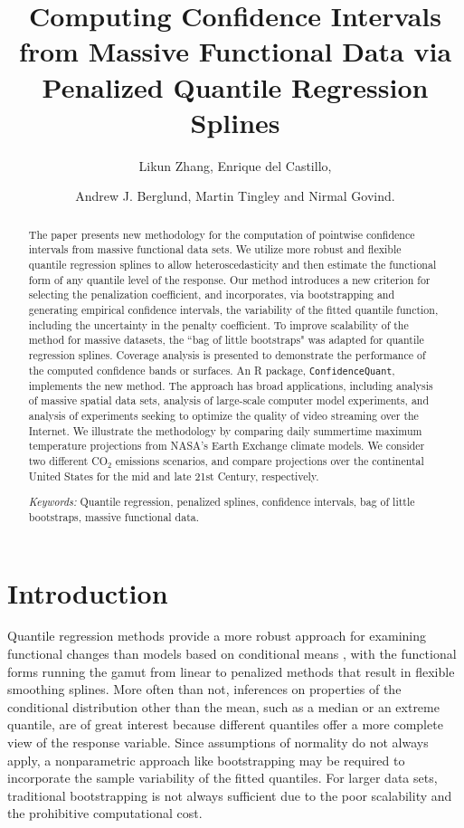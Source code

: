 \documentclass{statsoc}
\title[Computing Confidence Intervals via Penalized Quantile Regression Splines]{Computing Confidence Intervals from Massive Functional Data via Penalized Quantile Regression Splines}
\author{Likun Zhang, Enrique del Castillo,}
\author[L.Zhang, E.D.Castillo, A.J.Berglund, M.Tingley, and N.Govind]{Andrew J. Berglund, Martin Tingley and Nirmal Govind.}
\begin{document}
\begin{abstract}
The paper presents new methodology for the computation of pointwise confidence intervals from massive functional data sets. We utilize more robust and flexible quantile regression splines to allow heteroscedasticity and then estimate the functional form of any quantile level of the response. Our method introduces a new criterion for selecting the penalization coefficient, and incorporates, via bootstrapping and generating empirical confidence intervals, the variability of the fitted quantile function, including the uncertainty in the penalty coefficient. %
To improve scalability of the method for massive datasets, the ``bag of little bootstraps" was adapted for quantile regression splines. Coverage analysis is presented to demonstrate 
the performance of the computed confidence bands or surfaces. An R package, {\tt ConfidenceQuant}, implements the new method. The approach has broad applications, including analysis of massive spatial data sets, analysis of large-scale computer model experiments, and analysis of experiments seeking to optimize the quality of video streaming over the Internet. We illustrate the methodology by comparing daily summertime maximum temperature projections from NASA's Earth Exchange climate models. We consider two different CO${_2}$ emissions scenarios, and compare projections over the continental United States for the mid and late 21st Century, respectively. 

\textit{Keywords:}  Quantile regression, penalized splines, confidence intervals, bag of little bootstraps, massive functional data.
\end{abstract}


\section{Introduction}\label{s1}
Quantile regression methods provide a more robust approach for examining functional changes than models based on conditional means \citep{koenker2005quantile}, with the functional forms running the gamut from linear to penalized methods that result in flexible smoothing splines. More often than not, inferences on properties of the conditional distribution other than the mean, such as a median or an extreme quantile, are of great interest because different quantiles offer a more complete view of the response variable. Since assumptions of normality do not always apply, a nonparametric approach like bootstrapping may be required to incorporate the sample variability of the fitted quantiles. For larger data sets, traditional bootstrapping is not always sufficient due to the poor scalability and the prohibitive computational cost.
\end{document}

